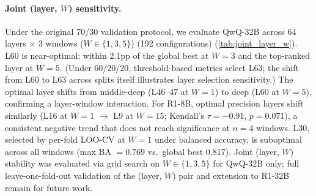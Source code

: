 \paragraph{Joint (layer, $W$) sensitivity.} Under the original 70/30 validation protocol, we evaluate QwQ-32B across 64 layers $\times$ 3 windows ($W \in \{1, 3, 5\}$) (192 configurations) (\cref{tab:joint_layer_w}). L60 is near-optimal: within 2.1pp of the global best at $W{=}3$ and the top-ranked layer at $W{=}5$. (Under 60/20/20, threshold-based metrics select L63; the shift from L60 to L63 across splits itself illustrates layer selection sensitivity.) The optimal layer shifts from middle-deep (L46--47 at $W{=}1$) to deep (L60 at $W{=}5$), confirming a layer-window interaction. For R1-8B, optimal precision layers shift similarly (L16 at $W{=}1$ $\to$ L9 at $W{=}15$; Kendall's $\tau{=}{-}0.91$, $p{=}0.071$), a consistent negative trend that does not reach significance at $n{=}4$ windows. L30, selected by per-fold LOO-CV at $W{=}1$ under balanced accuracy, is suboptimal across all windows (max BA $= 0.769$ vs.\ global best 0.817). Joint (layer, $W$) stability was evaluated via grid search on $W \in \{1, 3, 5\}$ for QwQ-32B only; full leave-one-fold-out validation of the (layer, $W$) pair and extension to R1-32B remain for future work.

\begin{table}[htbp]
\centering
\small
\caption{QwQ-32B joint (layer, $W$) grid search under 70/30 validation. L60 is near-optimal at recommended windows ($W{=}3$--$5$). L30 (LOO-CV selection at $W{=}1$) is suboptimal across all windows. Under the canonical 60/20/20 split, threshold-based metrics select L63.}
\label{tab:joint_layer_w}
\end{table}

